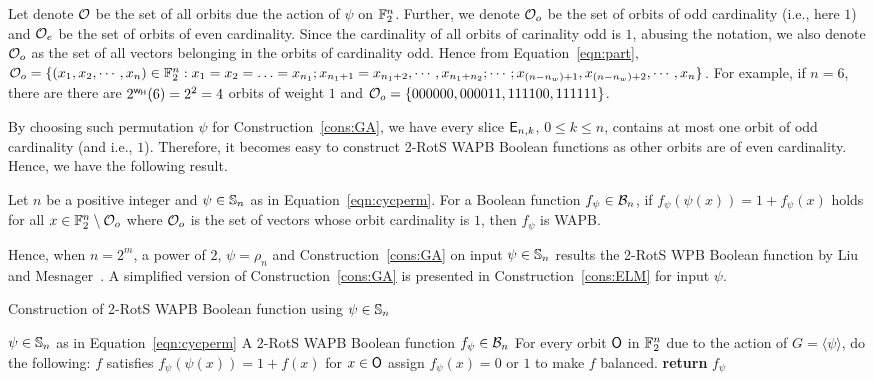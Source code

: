 \documentclass{llncs}
\begin{document}
Let denote $\mathcal{O}$ be the set of all orbits due the action of $\psi$ on $\mathbb{F}_2^n$. Further, we denote $\mathcal{O}_o$ be the set of orbits of odd cardinality (i.e., here $1$) and $\mathcal{O}_e$ be the set of orbits of even cardinality. Since the cardinality of all orbits of carinality odd is $1$, abusing the notation, we also denote $\mathcal{O}_o$ as the set of all vectors belonging in the orbits of cardinality odd. Hence from Equation~\ref{eqn:part}, 
$\mathcal{O}_o = \{(x_1, x_2, \cdots, x_n) \in \mathbb{F}_2^n : x_1 = x_2 = \ldots = x_{n_1}; x_{n_1 + 1} = x_{n_1 + 2}, \cdots, x_{n_1 + n_2}; \cdots ; x_{(n- n_w ) + 1},x_{(n- n_w ) + 2}, \cdots, x_n\}$.
For example, if $n = 6$, there are there are $2^{\mathsf{w_H}}(6) = 2^2 = 4$ orbits of weight $1$ and $\mathcal{O}_o = \{000000, 000011, 111100, 111111\}$. 


By choosing such permutation $\psi$ for Construction~\ref{cons:GA}, we have every slice $\mathsf{E}_{n,k}$, $0 \leq k \leq n$, contains at most one orbit of odd cardinality (and i.e., $1$). Therefore, it becomes easy to construct 2-RotS WAPB Boolean functions as other orbits are of even cardinality. Hence, we have the following result.
\begin{proposition}\label{prop:WAPB}
Let $n$ be a positive integer and $\psi \in \mathbb{S}_n$ as in Equation~\ref{eqn:cycperm}.
For a Boolean function $f_\psi \in \mathcal{B}_n$, if $f_\psi(\psi(x)) = 1+f_\psi(x)$ holds for all $x \in \mathbb{F}_2^n \setminus \mathcal{O}_o$ where $\mathcal{O}_o$ is the set of vectors whose orbit cardinality is $1$, then $f_\psi$ is WAPB.
\end{proposition}
Hence, when $n = 2^m$, a power of $2$, $\psi = \rho_n$ and Construction~\ref{cons:GA} on input $\psi \in \mathbb{S}_n$ results the 2-RotS WPB Boolean function by Liu and Mesnager~\cite{DCC:LiuMes19}. A simplified version of Construction~\ref{cons:GA} is presented in Construction~\ref{cons:ELM} for input $\psi$.

\begin{constr} \label{cons:ELM}
\caption{Construction of 2-RotS WAPB Boolean function using $\psi \in \mathbb{S}_n$}
\begin{algorithmic}[1]
\Require $\psi \in \mathbb{S}_n$ as in Equation~\ref{eqn:cycperm}
\Ensure A $2$-RotS WAPB Boolean function $f_\psi \in \mathcal{B}_n$
\State For every orbit $\mathsf{O}$ in $\mathbb{F}_2^n$ due to the action of $G = \langle \psi \rangle$, do the following:
	\State $f$ satisfies $f_\psi(\psi(x)) = 1+f(x)$ for $x \in \mathsf{O}$
\EndIf
{}
	\State assign $f_\psi(x) = 0$ or $1$ to make $f$ balanced.
\EndIf
\State \textbf{return} $f_\psi$
\end{algorithmic}
\end{constr}
\end{document}
